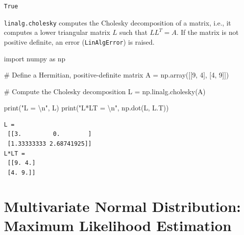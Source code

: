 \documentclass[
  letterpaper,
  DIV=11,
  numbers=noendperiod]{scrreprt}
\newenvironment{Shaded}{\begin{snugshade}}{\end{snugshade}}
\newcommand{\BuiltInTok}[1]{\textcolor[rgb]{0.00,0.23,0.31}{#1}}
\newcommand{\CharTok}[1]{\textcolor[rgb]{0.13,0.47,0.30}{#1}}
\newcommand{\CommentTok}[1]{\textcolor[rgb]{0.37,0.37,0.37}{#1}}
\newcommand{\DecValTok}[1]{\textcolor[rgb]{0.68,0.00,0.00}{#1}}
\newcommand{\ImportTok}[1]{\textcolor[rgb]{0.00,0.46,0.62}{#1}}
\newcommand{\NormalTok}[1]{\textcolor[rgb]{0.00,0.23,0.31}{#1}}
\newcommand{\OperatorTok}[1]{\textcolor[rgb]{0.37,0.37,0.37}{#1}}
\newcommand{\StringTok}[1]{\textcolor[rgb]{0.13,0.47,0.30}{#1}}
\begin{document}
\begin{verbatim}
True
\end{verbatim}

\begin{tcolorbox}[enhanced jigsaw, opacityback=0, left=2mm, title=\textcolor{quarto-callout-note-color}{\faInfo}\hspace{0.5em}{Example: Cholesky decomposition.}, bottomrule=.15mm, titlerule=0mm, arc=.35mm, leftrule=.75mm, colbacktitle=quarto-callout-note-color!10!white, bottomtitle=1mm, opacitybacktitle=0.6, coltitle=black, colframe=quarto-callout-note-color-frame, toprule=.15mm, breakable, colback=white, toptitle=1mm, rightrule=.15mm]

\texttt{linalg.cholesky} computes the Cholesky decomposition of a
matrix, i.e., it computes a lower triangular matrix \(L\) such that
\(LL^T = A\). If the matrix is not positive definite, an error
(\texttt{LinAlgError}) is raised.

\begin{Shaded}
\begin{Highlighting}[]
\ImportTok{import}\NormalTok{ numpy }\ImportTok{as}\NormalTok{ np}

\CommentTok{\# Define a Hermitian, positive{-}definite matrix}
\NormalTok{A }\OperatorTok{=}\NormalTok{ np.array([[}\DecValTok{9}\NormalTok{, }\DecValTok{4}\NormalTok{], [}\DecValTok{4}\NormalTok{, }\DecValTok{9}\NormalTok{]]) }

\CommentTok{\# Compute the Cholesky decomposition}
\NormalTok{L }\OperatorTok{=}\NormalTok{ np.linalg.cholesky(A)}

\BuiltInTok{print}\NormalTok{(}\StringTok{"L = }\CharTok{\textbackslash{}n}\StringTok{"}\NormalTok{, L)}
\BuiltInTok{print}\NormalTok{(}\StringTok{"L*LT = }\CharTok{\textbackslash{}n}\StringTok{"}\NormalTok{, np.dot(L, L.T))}
\end{Highlighting}
\end{Shaded}

\begin{verbatim}
L = 
 [[3.         0.        ]
 [1.33333333 2.68741925]]
L*LT = 
 [[9. 4.]
 [4. 9.]]
\end{verbatim}

\end{tcolorbox}

\hypertarget{multivariate-normal-distribution-maximum-likelihood-estimation}{%
\section{Multivariate Normal Distribution: Maximum Likelihood
Estimation}\label{multivariate-normal-distribution-maximum-likelihood-estimation}}
\end{document}

